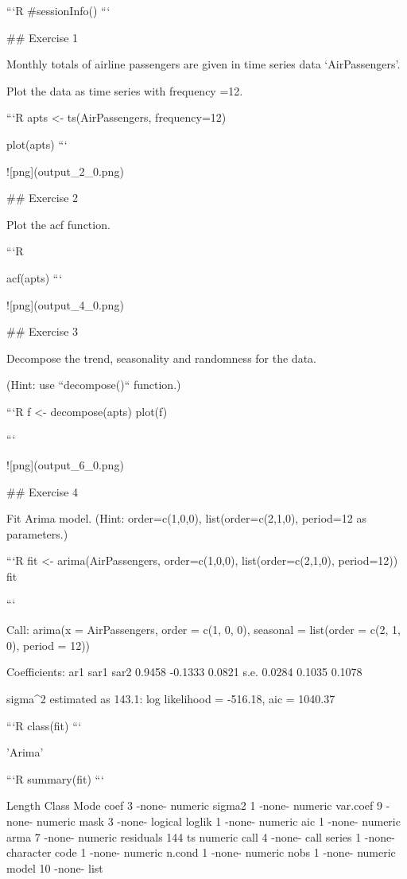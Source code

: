 \documentclass[a4paper,12pt]{article}
\begin{document}
```R
#sessionInfo()
```

## Exercise 1

Monthly totals of airline passengers are given in time series data ‘AirPassengers’.

Plot the data as time series with frequency =12.



```R
apts <- ts(AirPassengers, frequency=12)

plot(apts)
```


![png](output_2_0.png)


## Exercise 2

Plot the acf function.



```R

acf(apts)
```


![png](output_4_0.png)


## Exercise 3

Decompose the trend, seasonality and randomness for the data.

(Hint: use ``decompose()`` function.)



```R
f <- decompose(apts)
plot(f)



```


![png](output_6_0.png)


## Exercise 4

Fit Arima model.
(Hint: order=c(1,0,0), list(order=c(2,1,0), period=12 as parameters.)



```R
fit <- arima(AirPassengers, order=c(1,0,0), list(order=c(2,1,0), period=12))
fit


```


    
    Call:
    arima(x = AirPassengers, order = c(1, 0, 0), seasonal = list(order = c(2, 1, 
        0), period = 12))
    
    Coefficients:
             ar1     sar1    sar2
          0.9458  -0.1333  0.0821
    s.e.  0.0284   0.1035  0.1078
    
    sigma^2 estimated as 143.1:  log likelihood = -516.18,  aic = 1040.37



```R
class(fit)
```


'Arima'



```R
summary(fit)
```


              Length Class  Mode     
    coef        3    -none- numeric  
    sigma2      1    -none- numeric  
    var.coef    9    -none- numeric  
    mask        3    -none- logical  
    loglik      1    -none- numeric  
    aic         1    -none- numeric  
    arma        7    -none- numeric  
    residuals 144    ts     numeric  
    call        4    -none- call     
    series      1    -none- character
    code        1    -none- numeric  
    n.cond      1    -none- numeric  
    nobs        1    -none- numeric  
    model      10    -none- list     
\end{document}
